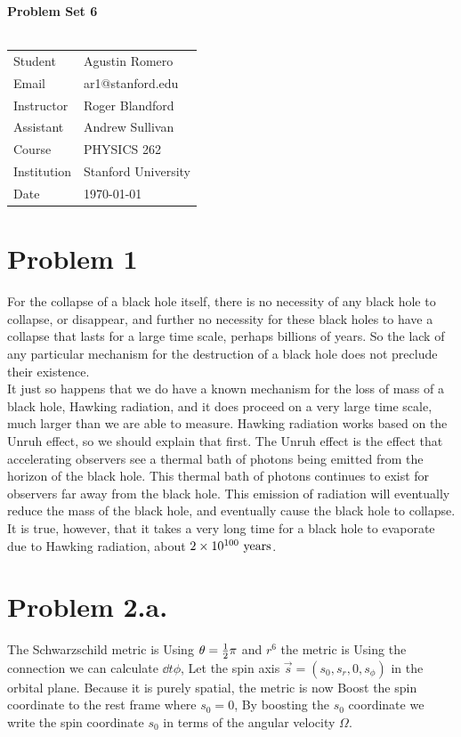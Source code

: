 \documentclass{article}
\begin{document}
\begin{center}
\textbf{\Large{Problem Set 6}}\\~\\
\begin{tabular}{l l}
Student&Agustin Romero\\
Email&ar1@stanford.edu\\
Instructor&Roger Blandford\\
Assistant&Andrew Sullivan\\
Course&PHYSICS 262\\
Institution&Stanford University\\
Date&\today\\
\end{tabular}
\end{center}
\section*{Problem 1}
For the collapse of a black hole itself, there is no necessity of any black hole to collapse, or disappear, and further no necessity for these black holes to have a collapse that lasts for a large time scale, perhaps billions of years. So the lack of any particular mechanism for the destruction of a black hole does not preclude their existence.\~\\

It just so happens that we do have a known mechanism for the loss of mass of a black hole, Hawking radiation, and it does proceed on a very large time scale, much larger than we are able to measure. Hawking radiation works based on the Unruh effect, so we should explain that first. The Unruh effect is the effect that accelerating observers see a thermal bath of photons being emitted from the horizon of the black hole. This thermal bath of photons continues to exist for observers far away from the black hole. This emission of radiation will eventually reduce the mass of the black hole, and eventually cause the black hole to collapse. It is true, however, that it takes a very long time for a black hole to evaporate due to Hawking radiation, about $2\times 10^{100}\textrm{ years}$.
\section*{Problem 2.a.}
The Schwarzschild metric is
Using $\theta=\frac{1}{2}\pi$ and $r^6$ the metric is
Using the connection we can calculate $\dd{t}\phi$,
Let the spin axis $\vec{s}=(s_0,s_r,0,s_\phi)$ in the orbital plane. Because it is purely spatial, the metric is now
Boost the spin coordinate to the rest frame where $s_0=0$,
By boosting the $s_0$ coordinate we write the spin coordinate $s_0$ in terms of the angular velocity $\Omega$.
\end{document}
